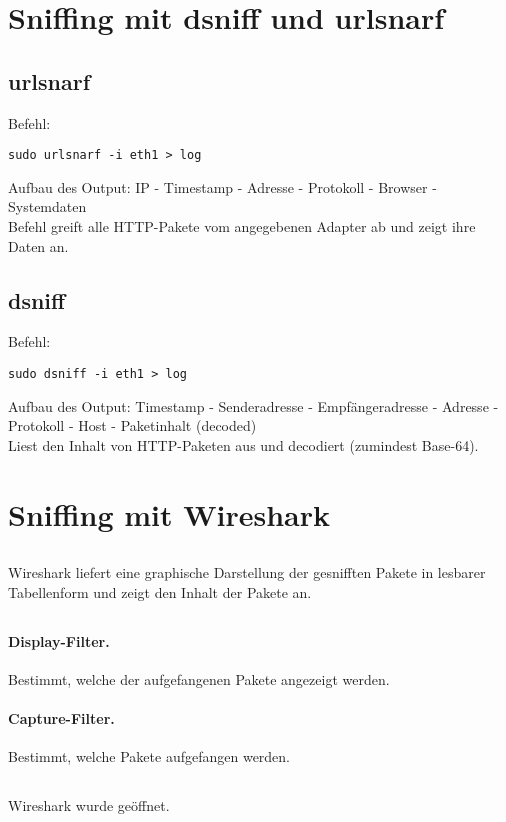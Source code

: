\documentclass[twoside]{article}
\begin{document}
\section{Sniffing mit dsniff und urlsnarf}
\subsection{urlsnarf}
Befehl:
\begin{lstlisting}
sudo urlsnarf -i eth1 > log
\end{lstlisting}
Aufbau des Output: IP - Timestamp - Adresse - Protokoll - Browser - Systemdaten\\
Befehl greift alle HTTP-Pakete vom angegebenen Adapter ab und zeigt ihre Daten an.
\subsection{dsniff}
Befehl:
\begin{lstlisting}
sudo dsniff -i eth1 > log
\end{lstlisting}
Aufbau des Output: Timestamp - Senderadresse - Empfängeradresse - Adresse - Protokoll - Host - Paketinhalt (decoded)\\
Liest den Inhalt von HTTP-Paketen aus und decodiert (zumindest Base-64).
\section{Sniffing mit Wireshark}
\subsection{}
Wireshark liefert eine graphische Darstellung der gesnifften Pakete in lesbarer Tabellenform und zeigt den Inhalt der Pakete an.
\subsection{}
\paragraph{Display-Filter.}
Bestimmt, welche der aufgefangenen Pakete angezeigt werden.
\paragraph{Capture-Filter.}
Bestimmt, welche Pakete aufgefangen werden.
\subsection{}
Wireshark wurde geöffnet.
\end{document}
